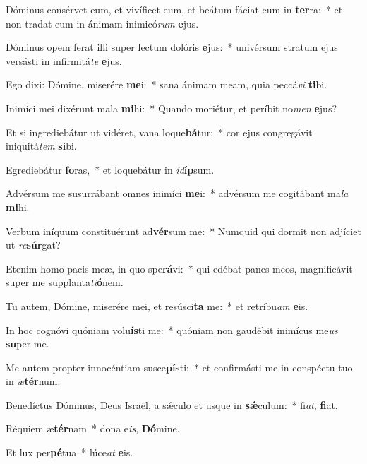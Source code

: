 \item Dóminus consérvet eum, et vivíficet eum, et beátum fáciat eum in \textbf{ter}ra:~* et non tradat eum in ánimam inimicó\textit{rum} \textbf{e}jus.

\item Dóminus opem ferat illi super lectum dolóris \textbf{e}jus:~* univérsum stratum ejus versásti in infirmitá\textit{te} \textbf{e}jus.

\item Ego dixi: Dómine, miserére \textbf{me}i:~* sana ánimam meam, quia peccá\textit{vi} \textbf{ti}bi.

\item Inimíci mei dixérunt mala \textbf{mi}hi:~* Quando moriétur, et períbit no\textit{men} \textbf{e}jus?

\item Et si ingrediebátur ut vidéret, vana loque\textbf{bá}tur:~* cor ejus congregávit iniquitá\textit{tem} \textbf{si}bi.

\item Egrediebátur \textbf{fo}ras,~* et loquebátur in \textit{id}\textbf{íp}sum.

\item Advérsum me susurrábant omnes inimíci \textbf{me}i:~* advérsum me cogitábant ma\textit{la} \textbf{mi}hi.

\item Verbum iníquum constituérunt ad\textbf{vér}sum me:~* Numquid qui dormit non adjíciet ut \textit{re}\textbf{súr}gat?

\item Etenim homo pacis meæ, in quo spe\textbf{rá}vi:~* qui edébat panes meos, magnificávit super me supplanta\textit{ti}\textbf{ó}nem.

\item Tu autem, Dómine, miserére mei, et resúsci\textbf{ta} me:~* et retríbu\textit{am} \textbf{e}is.

\item In hoc cognóvi quóniam volu\textbf{ís}ti me:~* quóniam non gaudébit inimícus me\textit{us} \textbf{su}per me.

\item Me autem propter innocéntiam susce\textbf{pís}ti:~* et confirmásti me in conspéctu tuo in \textit{æ}\textbf{tér}num.

\item Benedíctus Dóminus, Deus Israël, a sǽculo et usque in \textbf{sǽ}culum:~* fi\textit{at}, \textbf{fi}at.

\item Réquiem æ\textbf{tér}nam~* dona e\textit{is}, \textbf{Dó}mine.

\item Et lux per\textbf{pé}tua~* lúce\textit{at} \textbf{e}is.